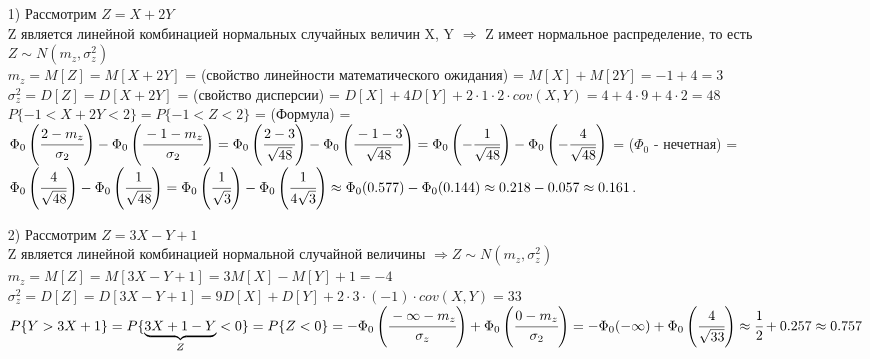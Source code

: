 \begin{enumerate}
	\item[1)] Рассмотрим $Z = X + 2Y$\\
	Z является линейной комбинацией нормальных случайных величин X, Y $\Rightarrow$ Z имеет нормальное распределение, то есть\\
	$Z \sim N(m_z, \sigma_z^2)$\\
	$m_z = M[Z] = M[X + 2Y]$ = (свойство линейности математического ожидания) = $M[X] + M[2Y] = -1 + 4 = 3$\\
	$\sigma_z^2 = D[Z] = D[X + 2Y]$ = (свойство дисперсии) = $D[X] + 4D[Y] + 2 \cdot 1 \cdot 2 \cdot cov(X, Y) = 4 + 4 \cdot 9 + 4 \cdot 2 = 48$\\
	$P\{-1 < X + 2Y < 2\} = P\{-1 < Z < 2\}$ = (Формула) = $\Phi_0 \left(\cfrac{2 - m_z}{\sigma_2}\right) - \Phi_0 \left(\cfrac{-1 - m_z}{\sigma_2}\right) = \Phi_0 \left(\cfrac{2 - 3}{\sqrt{48}}\right) - \Phi_0 \left(\cfrac{-1 - 3}{\sqrt{48}}\right) = \Phi_0 \left(-\cfrac{1}{\sqrt{48}}\right) - \Phi_0 \left(-\cfrac{4}{\sqrt{48}}\right)$ = ($\Phi_0$ - нечетная) = $\Phi_0 \left(\cfrac{4}{\sqrt{48}}\right) - \Phi_0 \left(\cfrac{1}{\sqrt{48}}\right) = \Phi_0 \left(\cfrac{1}{\sqrt{3}}\right) - \Phi_0 \left(\cfrac{1}{4\sqrt{3}}\right) \approx \Phi_0 (0.577) - \Phi_0 (0.144) \approx 0.218 - 0.057 \approx 0.161$.
	
	\item[2)] Рассмотрим $Z = 3X - Y + 1$\\
	Z является линейной комбинацией нормальной случайной величины $\Rightarrow Z \sim N(m_z, \sigma_z^2)$\\
	$m_z = M[Z] = M[3X - Y + 1] = 3M[X] - M[Y] + 1 = -4$\\
	$\sigma_z^2 = D[Z] = D[3X - Y + 1] = 9D[X] + D[Y] + 2 \cdot 3 \cdot (-1) \cdot cov(X,Y) = 33$\\
	$P\{Y > 3X + 1\} = P\{\underbrace{3X + 1 - Y}_{Z} < 0\} = P\{Z < 0\} = -\Phi_0 \left(\cfrac{-\infty - m_z}{\sigma_z}\right) + \Phi_0 \left(\cfrac{0 - m_z}{\sigma_2}\right) = -\Phi_0 (-\infty) + \Phi_0 \left(\cfrac{4}{\sqrt{33}}\right) \approx \cfrac12 + 0.257 \approx 0.757$\\
	

\end{enumerate}
